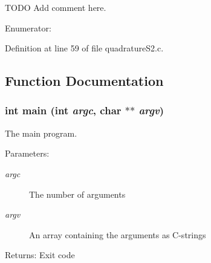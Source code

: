 TODO Add comment here. 

\begin{Desc}
\item[Enumerator: ]\par
\begin{description}
\item[{\em 
\hypertarget{group__applications__quadratureS2__test_gg811fe196a5d9d37857c2f8adeeaac3c61df7f7d70a21620c0c5434cf7fdafb66}{
USE\_\-GRID}
\label{group__applications__quadratureS2__test_gg811fe196a5d9d37857c2f8adeeaac3c61df7f7d70a21620c0c5434cf7fdafb66}
}]\item[{\em 
\hypertarget{group__applications__quadratureS2__test_gg811fe196a5d9d37857c2f8adeeaac3c6a2b65445a3a16f164c5e811064d75726}{
RANDOM}
\label{group__applications__quadratureS2__test_gg811fe196a5d9d37857c2f8adeeaac3c6a2b65445a3a16f164c5e811064d75726}
}]\end{description}
\end{Desc}



Definition at line 59 of file quadratureS2.c.

\subsection{Function Documentation}
\hypertarget{group__applications__quadratureS2__test_g3c04138a5bfe5d72780bb7e82a18e627}{
\subsubsection{\setlength{\rightskip}{0pt plus 5cm}int main (int {\em argc}, char $\ast$$\ast$ {\em argv})}}
\label{group__applications__quadratureS2__test_g3c04138a5bfe5d72780bb7e82a18e627}


The main program. 

\begin{Desc}
\item[Parameters:]
\begin{description}
\item[{\em argc}]The number of arguments \item[{\em argv}]An array containing the arguments as C-strings\end{description}
\end{Desc}
\begin{Desc}
\item[Returns:]Exit code \end{Desc}


